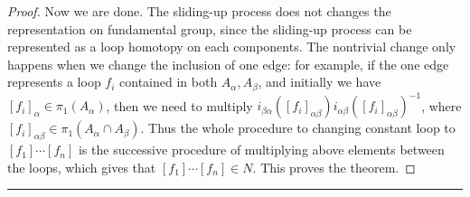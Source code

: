 \begin{proof}
Now we are done. The sliding-up process does not changes the representation on fundamental group, since the sliding-up process can be represented as a loop homotopy on each components. The nontrivial change only happens when we change the inclusion of one edge: for example, if the one edge represents a loop $f_i$ contained in both $A_\alpha,A_\beta$, and initially we have $[f_i]_\alpha\in \pi_1(A_\alpha)$, then we need to multiply $i_{\beta\alpha}([f_i]_{\alpha\beta})i_{\alpha\beta}([f_i]_{\alpha\beta})^{-1}$, where $[f_i]_{\alpha\beta}\in\pi_1(A_\alpha\cap A_\beta)$. Thus the whole procedure to changing constant loop to $[f_1]\cdots [f_n]$ is the successive procedure of multiplying above elements between the loops, which gives that $[f_1]\cdots [f_n]\in N$. This proves the theorem.
\end{proof}
\noindent\rule{\textwidth}{1pt}
\newline
